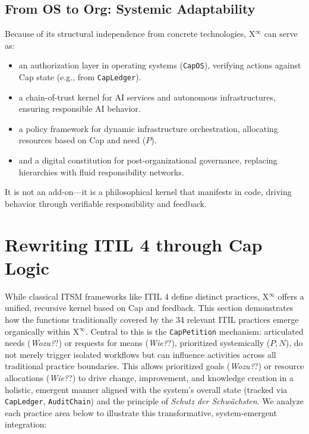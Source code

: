 \documentclass[12pt, a4paper]{scrartcl}
\newcommand{\Xinf}{X$^\infty$}                        %
\newcommand{\CapLedger}{\texttt{CapLedger}}          %
\newcommand{\AuditChain}{\texttt{AuditChain}}
\newcommand{\CapPetition}{\texttt{CapPetition}}        %
\newcommand{\Wozu}{\textit{Wozu?}}                      %
\newcommand{\Wie}{\textit{Wie?}}                        %
\begin{document}
\subsection{From OS to Org: Systemic Adaptability}
Because of its structural independence from concrete technologies, \Xinf{} can serve as:
\begin{itemize}
    \item an authorization layer in operating systems (\texttt{CapOS}), verifying actions against Cap state (e.g., from \CapLedger{}).
    \item a chain-of-trust kernel for AI services and autonomous infrastructures, ensuring responsible AI behavior.
    \item a policy framework for dynamic infrastructure orchestration, allocating resources based on Cap and need ($P$).
    \item and a digital constitution for post-organizational governance, replacing hierarchies with fluid responsibility networks.
\end{itemize}
It is not an add-on—it is a philosophical kernel that manifests in code, driving behavior through verifiable responsibility and feedback.


\section{Rewriting ITIL 4 through Cap Logic}

While classical ITSM frameworks like ITIL 4 define distinct practices, \Xinf{} offers a unified, recursive kernel based on Cap and feedback. This section demonstrates how the functions traditionally covered by the 34 relevant ITIL practices emerge organically within \Xinf{}. Central to this is the \CapPetition{} mechanism: articulated needs (\Wozu?) or requests for means (\Wie?), prioritized systemically ($P, N$), do not merely trigger isolated workflows but can influence activities across all traditional practice boundaries. This allows prioritized goals (\Wozu?) or resource allocations (\Wie?) to drive change, improvement, and knowledge creation in a holistic, emergent manner aligned with the system's overall state (tracked via \CapLedger{}, \AuditChain{}) and the principle of \textit{Schutz der Schwächsten}. We analyze each practice area below to illustrate this transformative, system-emergent integration:

\end{document}
